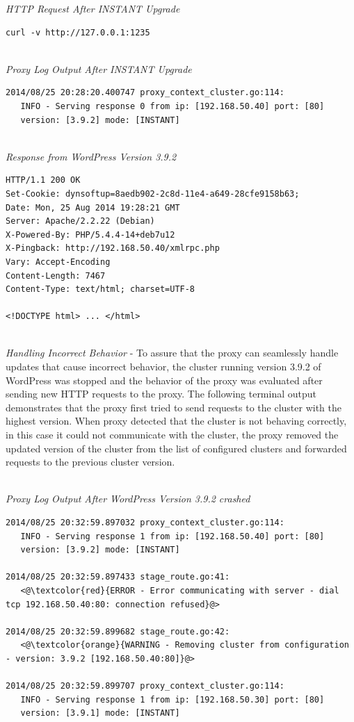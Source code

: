 \documentclass[a4paper,11pt,twoside]{report}
\begin{document}
\noindent
\textit{HTTP Request After INSTANT Upgrade}
\begin{lstlisting}[language=terminal]
curl -v http://127.0.0.1:1235
\end{lstlisting}

\noindent\\
\textit{Proxy Log Output After INSTANT Upgrade}
\begin{lstlisting}[language=terminal]
2014/08/25 20:28:20.400747 proxy_context_cluster.go:114:     
   INFO - Serving response 0 from ip: [192.168.50.40] port: [80] 
   version: [3.9.2] mode: [INSTANT]
\end{lstlisting}

\noindent\\
\textit{Response from WordPress Version 3.9.2 }
\begin{lstlisting}[language=terminal]
HTTP/1.1 200 OK
Set-Cookie: dynsoftup=8aedb902-2c8d-11e4-a649-28cfe9158b63;
Date: Mon, 25 Aug 2014 19:28:21 GMT
Server: Apache/2.2.22 (Debian)
X-Powered-By: PHP/5.4.4-14+deb7u12
X-Pingback: http://192.168.50.40/xmlrpc.php
Vary: Accept-Encoding
Content-Length: 7467
Content-Type: text/html; charset=UTF-8

<!DOCTYPE html> ... </html>
\end{lstlisting}

\noindent\\
\textit{Handling Incorrect Behavior} - To assure that the proxy can seamlessly handle updates that cause incorrect behavior, the cluster running version 3.9.2 of WordPress was stopped and the behavior of the proxy was evaluated after sending new HTTP requests to the proxy. The following terminal output demonstrates that the proxy first tried to send requests to the cluster with the highest version. When proxy detected that the cluster is not behaving correctly, in this case it could not communicate with the cluster, the proxy removed the updated version of the cluster from the list of configured clusters and forwarded requests to the previous cluster version. 

\noindent\\
\textit{Proxy Log Output After WordPress Version 3.9.2 crashed}
\begin{lstlisting}[language=terminal]
2014/08/25 20:32:59.897032 proxy_context_cluster.go:114:     
   INFO - Serving response 1 from ip: [192.168.50.40] port: [80] 
   version: [3.9.2] mode: [INSTANT]
   
2014/08/25 20:32:59.897433 stage_route.go:41:    
   <@\textcolor{red}{ERROR - Error communicating with server - dial tcp 192.168.50.40:80: connection refused}@>

2014/08/25 20:32:59.899682 stage_route.go:42:  
   <@\textcolor{orange}{WARNING - Removing cluster from configuration - version: 3.9.2 [192.168.50.40:80]}@>

2014/08/25 20:32:59.899707 proxy_context_cluster.go:114:     
   INFO - Serving response 1 from ip: [192.168.50.30] port: [80] 
   version: [3.9.1] mode: [INSTANT]
\end{lstlisting}
\end{document}
